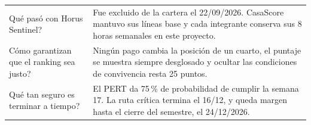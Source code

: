 \documentclass[11pt,a4paper]{article}
\begin{document}
{\begin{tabularx}{\textwidth}{@{}P{5.1cm} L@{}}
Qué pasó con Horus Sentinel? & Fue excluido de la cartera el 22/09/2026. CasaScore mantuvo sus líneas base y cada integrante conserva sus 8 horas semanales en este proyecto. \\
Cómo garantizan que el ranking sea justo? & Ningún pago cambia la posición de un cuarto, el puntaje se muestra siempre desglosado y ocultar las condiciones de convivencia resta 25 puntos. \\
Qué tan seguro es terminar a tiempo? & El PERT da 75\,\% de probabilidad de cumplir la semana 17. La ruta crítica termina el 16/12, y queda margen hasta el cierre del semestre, el 24/12/2026. \\
\bottomrule
\end{tabularx}
}
\end{document}
